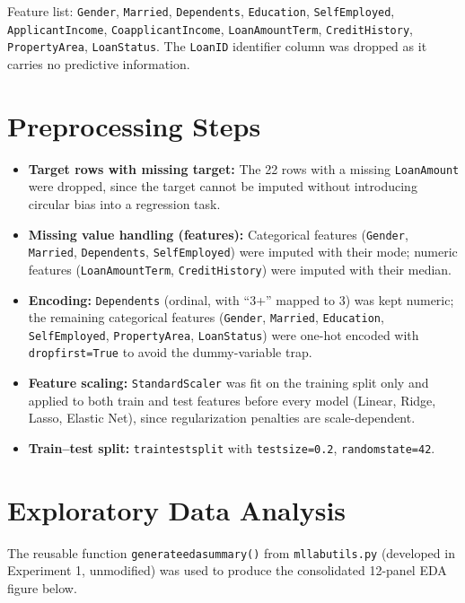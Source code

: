 \documentclass[12pt,a4paper]{article}
\DeclareRobustCommand{\_}{\textunderscore\allowbreak}
\begin{document}
Feature list: \texttt{Gender}, \texttt{Married}, \texttt{Dependents},
\texttt{Education}, \texttt{Self\_Employed}, \texttt{ApplicantIncome},
\texttt{CoapplicantIncome}, \texttt{Loan\_Amount\_Term},
\texttt{Credit\_History}, \texttt{Property\_Area}, \texttt{Loan\_Status}.
The \texttt{Loan\_ID} identifier column was dropped as it carries no
predictive information.

\section{Preprocessing Steps}
\begin{itemize}
\item \textbf{Target rows with missing target:} The 22 rows with a missing
\texttt{LoanAmount} were dropped, since the target cannot be imputed without
introducing circular bias into a regression task.
\item \textbf{Missing value handling (features):} Categorical features
(\texttt{Gender}, \texttt{Married}, \texttt{Dependents}, \texttt{Self\_Employed})
were imputed with their mode; numeric features (\texttt{Loan\_Amount\_Term},
\texttt{Credit\_History}) were imputed with their median.
\item \textbf{Encoding:} \texttt{Dependents} (ordinal, with ``3+'' mapped to
3) was kept numeric; the remaining categorical features (\texttt{Gender},
\texttt{Married}, \texttt{Education}, \texttt{Self\_Employed},
\texttt{Property\_Area}, \texttt{Loan\_Status}) were one-hot encoded with
\texttt{drop\_first=True} to avoid the dummy-variable trap.
\item \textbf{Feature scaling:} \texttt{StandardScaler} was fit on the
training split only and applied to both train and test features before
every model (Linear, Ridge, Lasso, Elastic Net), since regularization
penalties are scale-dependent.
\item \textbf{Train--test split:} \texttt{train\_test\_split} with
\texttt{test\_size=0.2}, \texttt{random\_state=42}.
\end{itemize}

\section{Exploratory Data Analysis}

The reusable function \texttt{generate\_eda\_summary()} from
\texttt{ml\_lab\_utils.py} (developed in Experiment 1, unmodified) was used
to produce the consolidated 12-panel EDA figure below.
\end{document}
